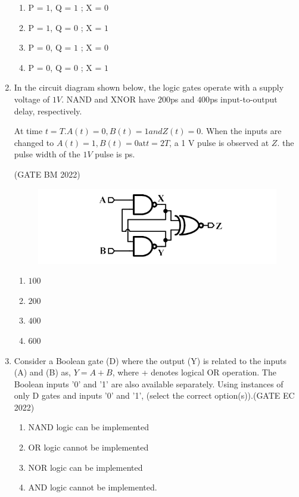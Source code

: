 \begin{enumerate}
\begin{enumerate}[label=(\Alph*)]
	\item P = $1$, Q = $1$ ; X = $0$
	\item P = $1$, Q = $0$ ; X = $1$
	\item P = $0$, Q = $1$ ; X = $0$
	\item P = $0$, Q = $0$ ; X = $1$
\end{enumerate}

\item In the circuit diagram shown below, the logic gates operate with a supply voltage of $1 V$. NAND and XNOR have $200$ps and $400$ps input-to-output delay, respectively.

At time $t=T.A(t)=0,B(t)=1 and Z(t)=0.$ When the inputs are changed to $A(t)=1,B(t)=0 \text{at} t=2T$, a 1 V pulse is observed at $Z$. the pulse width of the $1 V$ pulse is  ps.


\hfill{(GATE BM 2022)}

\begin{figure}[H]
	\centering
	\includegraphics[width=\columnwidth]{figs/bm2022.png}
	\caption{}
	\label{fig:GATE Digram}
\end{figure}

\begin{enumerate}
	\item $100$
	\item $200$
	\item $400$
	\item $600$
	      \end {enumerate}

	\item
	      Consider a Boolean gate (D) where the output (Y) is related to the inputs (A) and (B) as, $Y = A + B$, where + denotes logical OR operation. The Boolean inputs '0' and '1' are also available separately. Using instances of only D gates and inputs '0' and '1', (select the correct option(s)).\hfill{(GATE EC 2022)}

	      \begin{enumerate}
		      \item  NAND logic can be implemented
		      \item  OR logic cannot be implemented
		      \item  NOR logic can be implemented
		      \item  AND logic cannot be implemented.
	      \end{enumerate}


\end{enumerate}
